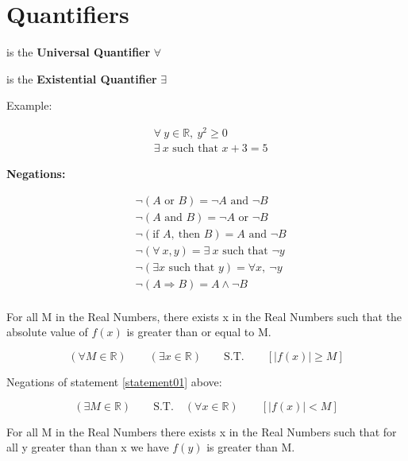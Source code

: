 \section{Quantifiers}

 is the \textbf{Universal Quantifier} $\forall$

 is the \textbf{Existential Quantifier} $\exists$

Example:

\[
  \begin{aligned}
    &\forall\ y \in \mathbb{R},\ y^{2} \geq 0\\
    &\exists\ x \text{ such that } x+3=5
  \end{aligned}
\]

\textbf{Negations:}

\[
\begin{aligned}
  &\neg(A \text{ or } B) = \neg A \text{ and } \neg B\\
  &\neg(A \text{ and } B)= \neg A \text{ or } \neg B\\
  &\neg(\text{if } A,\ \text{then } B) = A \text{ and } \neg B\\
  &\neg (\forall\ x,y)= \exists\ x \text{ such that } \neg y\\
  &\neg (\exists x \text{ such that } y)= \forall x,\ \neg y\\
  &\neg (A \Longrightarrow B) = A \wedge \neg B\\
\end{aligned}
\]

For all M in the Real Numbers, there exists x in the Real Numbers such that the absolute value of $f(x)$ is greater than or equal to M.

\begin{equation}
  (\forall M \in \mathbb{R})\qquad (\exists x \in \mathbb{R})\qquad  \text{S.T.}\qquad  [|f(x)| \geq M]
  \label{statement01}
\end{equation}

Negations of statement \ref{statement01} above:

\begin{equation*}
  (\exists M \in \mathbb{R})\qquad \text{S.T.}\quad (\forall x \in \mathbb{R})\qquad  [|f(x)| < M]
\end{equation*}

\vspace{10 mm}

For all M in the Real Numbers there exists x in the Real Numbers such that for all y greater than than x we have $f(y)$ is greater than M.

